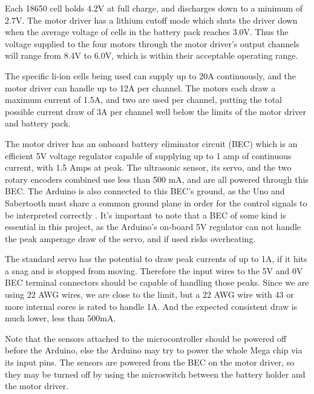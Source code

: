Each 18650 cell holds 4.2V at full charge, and discharges down to a minimum of 2.7V. The motor driver has a lithium cutoff mode which shuts the driver down when the average voltage of cells in the battery pack reaches 3.0V. Thus the voltage supplied to the four motors through the motor driver's output channels will range from 8.4V to 6.0V, which is within their acceptable operating range.

The specific li-ion cells being used can supply up to 20A continuously, and the motor driver can handle up to 12A per channel. The motors each draw a maximum current of 1.5A, and two are used per channel, putting the total possible current draw of 3A per channel well below the limits of the motor driver and battery pack.

The motor driver has an onboard battery eliminator circuit (BEC) which is an efficient 5V voltage regulator capable of supplying up to 1 amp of continuous current, with 1.5 Amps at peak. The ultrasonic sensor, its servo, and the two rotary encoders combined use less than 500 mA, and are all powered through this BEC.  The Arduino is also connected to this BEC's ground, as the Uno and Sabertooth must share a common ground plane in order for the control signals to be interpreted correctly \cite{sabertoothUserGuide}. It's important to note that a BEC of some kind is essential in this project, as the Arduino's on-board 5V regulator can not handle the peak amperage draw of the servo, and if used risks overheating.

The standard servo has the potential to draw peak currents of up to 1A, if it hits a snag and is stopped from moving. Therefore the input wires to the 5V and 0V BEC terminal connectors should be capable of handling those peaks. Since we are using 22 AWG wires, we are close to the limit, but a 22 AWG wire with 43 or more internal cores is rated to handle 1A. And the expected consistent draw is much lower, less than 500mA. 

Note that the sensors attached to the microcontroller should be powered off before the Arduino, else the Arduino may try to power the whole Mega chip via its input pins. The sensors are powered from the BEC on the motor driver, so they may be turned off by using the microswitch between the battery holder and the motor driver.


